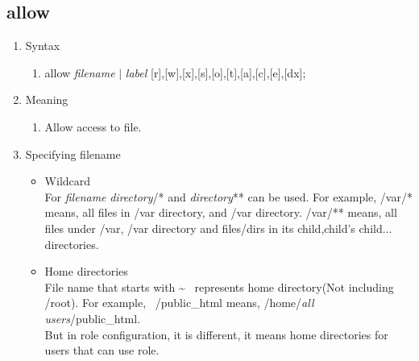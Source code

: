 \documentclass{article}
\begin{document}
\subsection{allow}\label{section:allow}
 \begin{enumerate}
  \item Syntax
	\begin{enumerate}
	 \item allow {\it filename} $\mid$ {\it label} [r],[w],[x],[s],[o],[t],[a],[c],[e],[dx];
	\end{enumerate}
  \item Meaning\\
	\begin{enumerate}
	 \item  Allow access to file.
	\end{enumerate}
  \item Specifying filename\\
	\begin{itemize}
	 \item Wildcard\\
	       For {\it filename} {\it directory}/* and {\it directory}** can
	be used.  For example, /var/* means, all files in /var
	directory, and /var directory. /var/** means, all files under
	/var, /var directory and files/dirs in its
	child,child's child... 	directories.
	 \item Home directories\\
	       File name that starts with  \textasciitilde ~ represents
	       home directory(Not including /root).
	       For example, ~/public\_html means,
	       /home/{\it all users}/public\_html.\\
	       But in role configuration, it is different, it means home directories for users that can use role.

	\end{itemize}


\end{enumerate}
\end{document}
